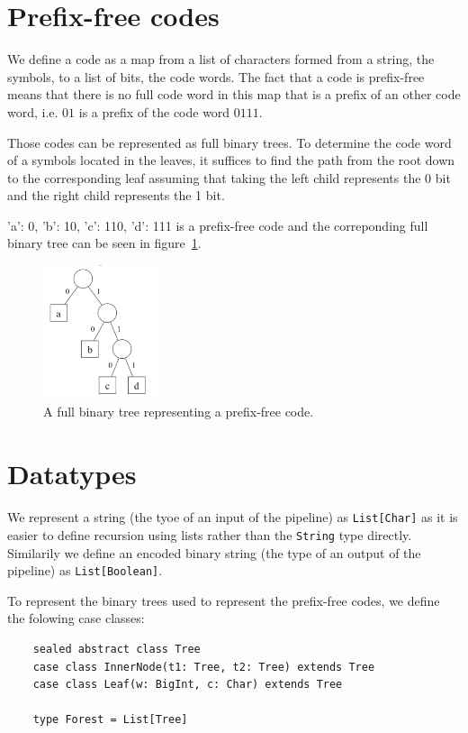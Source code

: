 \documentclass[a4paper,UKenglish,cleveref, autoref, thm-restate]{lipics-v2021}
\begin{document}
\section{Prefix-free codes} %

We define a code as a map from a list of characters formed from a string, the symbols, to a list of bits, the code words. The fact that a code is prefix-free means that there is no full code word in this map that is a prefix of an other code word, i.e. $01$ is a prefix of the code word $0111$.

Those codes can be represented as full binary trees. To determine the code word of a symbols located in the leaves, it suffices to find the path from the root down to the corresponding leaf assuming that taking the left child represents the 0 bit and the right child represents the 1 bit.

{'a': 0, 'b': 10, 'c': 110, 'd': 111} is a prefix-free code and the correponding full binary tree can be seen in figure~\ref{fig:pfc}.
\begin{figure}[ht]
    \centering
    \includegraphics[width=0.3\textwidth]{pfc.png}
    \caption{A full binary tree representing a prefix-free code.\label{fig:pfc}}
\end{figure}

\section{Datatypes} %

We represent a string (the tyoe of an input of the pipeline) as \lstinline{List[Char]} as it is easier to define recursion using lists rather than the \lstinline{String} type directly. 
Similarily we define an encoded binary string (the type of an output of the pipeline) as \lstinline{List[Boolean]}.

To represent the binary trees used to represent the prefix-free codes, we define the folowing case classes:

\begin{lstlisting}
    sealed abstract class Tree
    case class InnerNode(t1: Tree, t2: Tree) extends Tree
    case class Leaf(w: BigInt, c: Char) extends Tree
  
    type Forest = List[Tree]
\end{lstlisting}
\end{document}
